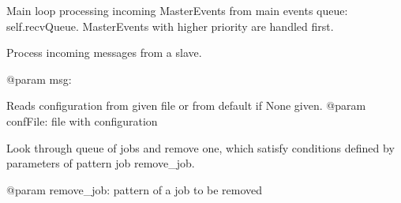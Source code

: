 \documentclass[letterpaper,10pt,english]{sphinxmanual}
\begin{document}
\begin{fulllineitems}
\begin{fulllineitems}
\label{ref-manual/XrdTestMaster:XrdTestMaster.XrdTestMaster.loadSuiteSessions}
\end{fulllineitems}


\begin{fulllineitems}
\label{ref-manual/XrdTestMaster:XrdTestMaster.XrdTestMaster.procEvents}
Main loop processing incoming MasterEvents from main events queue:
self.recvQueue. MasterEvents with higher priority are handled first.

\end{fulllineitems}


\begin{fulllineitems}
\label{ref-manual/XrdTestMaster:XrdTestMaster.XrdTestMaster.procSlaveMsg}
Process incoming messages from a slave.

@param msg:

\end{fulllineitems}


\begin{fulllineitems}
\label{ref-manual/XrdTestMaster:XrdTestMaster.XrdTestMaster.readConfig}
Reads configuration from given file or from default if None given.
@param confFile: file with configuration

\end{fulllineitems}


\begin{fulllineitems}
\label{ref-manual/XrdTestMaster:XrdTestMaster.XrdTestMaster.removeJob}
Look through queue of jobs and remove one, which satisfy conditions
defined by parameters of pattern job remove\_job.

@param remove\_job: pattern of a job to be removed

\end{fulllineitems}


\end{fulllineitems}
\end{document}
